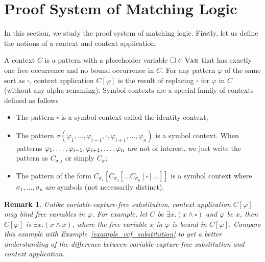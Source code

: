 \documentclass[acmsmall]{acmart}
\theoremstyle{acmdefinition}
\newtheorem{remark}{Remark}
\newcommand{\Var}{\textnormal{\textsc{Var}}}
\newcommand{\CSub}[1]{C_{#1}}
\newcommand{\Csigma}{\CSub{\sigma}}
\newcommand{\Csigmai}{\CSub{\sigma,i}}
\newcommand{\hole}{\square}
\newcommand{\ddd}{,\dots,}
\begin{document}
\section{Proof System of Matching Logic}

In this section,
we study the proof system of matching logic.
Firstly, let us define the notions of a context and context application.

\begin{definition}
A context $C$ is a pattern with a placeholder variable
$\hole \in \Var$ that has exactly one free occurrence
and no bound occurrence in $C$.
For any pattern $\varphi$ of the same sort as $\hole$,
context application $C[\varphi]$ is the result of
replacing $\hole$ for $\varphi$ in $C$ (without any alpha-renaming).
Symbol contexts are a special family of contexts defined as follows
\begin{itemize}
\item The pattern $\hole$ is a symbol context called the identity context;
\item The pattern
      $\sigma(\varphi_1 \ddd \varphi_{i-1}, 
              \hole , 
              \varphi_{i+1} \ddd \varphi_n)$
      is a symbol context.
      When patterns 
      $\varphi_1 \ddd \varphi_{i-1},\\ \varphi_{i+1} \ddd \varphi_n$
      are not of interest,
      we just write the pattern as $\Csigmai$ or simply $\Csigma$;
\item The pattern of the form
      $
      \CSub{\sigma_1}[\CSub{\sigma_2}[\dots  \CSub{\sigma_n}[\hole] \dots]]
      $
      is a symbol context
      where $\sigma_1 \ddd \sigma_n$ are symbols (not necessarily distinct).
\end{itemize}
\end{definition}

\begin{remark}
Unlike variable-capture-free substitution,
context application $C[\varphi]$ may bind free variables in $\varphi$.
For example,
let $C$ be $\exists x . (x \wedge \hole)$ and $\varphi$ be $x$,
then $C[\varphi]$ is $\exists x . (x \wedge x)$, 
where the free variable $x$ in $\varphi$
is bound in $C[\varphi]$.
Compare this example with Example~\ref{example_vcf_substitution} to get
a better understanding of
the difference between variable-capture-free substitution and context 
application.
\end{remark}
\end{document}
